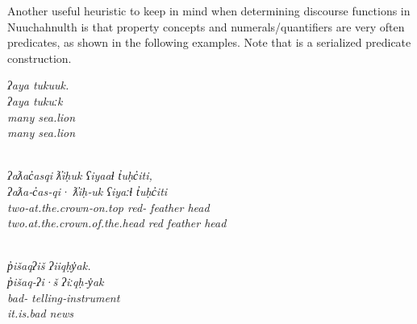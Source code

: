 Another useful heuristic to keep in mind when determining discourse functions in Nuuchahnulth is that property concepts and numerals/quantifiers are very often predicates, as shown in the following examples. Note that  is a serialized predicate construction.

\clearpage

\begin{exe}
  \ex\label{ex:3.15}
  \begin{xlist}

    \ex\label{ex:3.15a}
    \glllll \em{ʔaya}      tukuuk.\\
            \em{ʔaya}      tukuːk\\
            \em{many}      sea.lion\\
            \em{many}      sea.lion\\
            \em{} \\

    \ex\label{ex:3.15b}
    \glllll \em{ʔaƛac̓asqi}                    \em{ƛ̓iḥuk}       ʕiyaaɬ   t̓uḥc̓iti,\\
            \em{ʔaƛa‑c̓as‑qi·}                  \em{ƛ̓iḥ‑uk}      ʕiyaːɬ   t̓uḥc̓iti\\
            \em{two‑at.the.crown‑on.top}       \em{red‑} feather  head\\
            \em{two.at.the.crown.of.the.head} \em{red}          feather  head\\
            \em{}                    \em{}     \\

    \ex\label{ex:3.15c}
    \glllll \em{p̓išaqʔiš}       ʔiiqḥy̓ak.\\
            \em{p̓išaq‑ʔi·š}     ʔiːqḥ‑y̓ak\\
            \em{bad‑} telling‑instrument\\
            \em{it.is.bad}      news\\
                       \\

  \end{xlist}
\end{exe}

